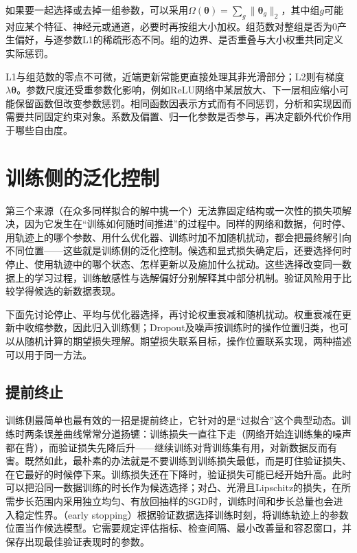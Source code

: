 如果要一起选择或去掉一组参数，可以采用$\Omega(\bm\theta)=\sum_g\lVert\bm\theta_g\rVert_2$，其中组$g$可能对应某个特征、神经元或通道，必要时再按组大小加权。组范数对整组是否为0产生偏好，与逐参数L1的稀疏形态不同。组的边界、是否重叠与大小权重共同定义实际惩罚。

L1与组范数的零点不可微，近端更新常能更直接处理其非光滑部分；L2则有梯度$\lambda\bm\theta$。参数尺度还受重参数化影响，例如ReLU网络中某层放大、下一层相应缩小可能保留函数但改变参数惩罚。相同函数因表示方式而有不同惩罚，分析和实现因而需要共同固定约束对象。系数及偏置、归一化参数是否参与，再决定额外代价作用于哪些自由度。

\section{训练侧的泛化控制}
\label{sec:generalization-training-process}

第三个来源（在众多同样拟合的解中挑一个）无法靠固定结构或一次性的损失项解决，因为它发生在“训练如何随时间推进”的过程中。同样的网络和数据，何时停、用轨迹上的哪个参数、用什么优化器、训练时加不加随机扰动，都会把最终解引向不同位置——这些就是训练侧的泛化控制。候选和显式损失确定后，还要选择何时停止、使用轨迹中的哪个状态、怎样更新以及施加什么扰动。这些选择改变同一数据上的学习过程，训练敏感性与选解偏好分别解释其中部分机制。验证风险用于比较学得候选的新数据表现。

下面先讨论停止、平均与优化器选择，再讨论权重衰减和随机扰动。权重衰减在更新中收缩参数，因此归入训练侧；Dropout及噪声按训练时的操作位置归类，也可以从随机计算的期望损失理解。期望损失联系目标，操作位置联系实现，两种描述可以用于同一方法。

\subsection{提前终止}
\label{sec:generalization-early-stopping}

训练侧最简单也最有效的一招是提前终止，它针对的是“过拟合”这个典型动态。训练时两条误差曲线常常分道扬镳：训练损失一直往下走（网络开始连训练集的噪声都在背），而验证损失先降后升——继续训练对背训练集有用，对新数据反而有害。既然如此，最朴素的办法就是不要训练到训练损失最低，而是盯住验证损失、在它最好的时候停下来。训练损失还在下降时，验证损失可能已经开始升高。此时可以把沿同一数据训练的时长作为候选选择；对凸、光滑且Lipschitz的损失，在所需步长范围内采用独立均匀、有放回抽样的SGD时，训练时间和步长总量也会进入稳定性界。（early stopping）根据验证数据选择训练时刻，将训练轨迹上的参数位置当作候选模型。它需要规定评估指标、检查间隔、最小改善量和容忍窗口，并保存出现最佳验证表现时的参数。

